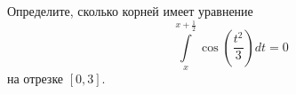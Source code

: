 \documentclass{article}
\begin{document}
Определите, сколько корней имеет уравнение
$$\int\limits_x^{x+\frac{1}{2}} \cos \left( \frac{t^2}{3} \right) dt = 0$$
на отрезке $[0,3]$.
\end{document}
